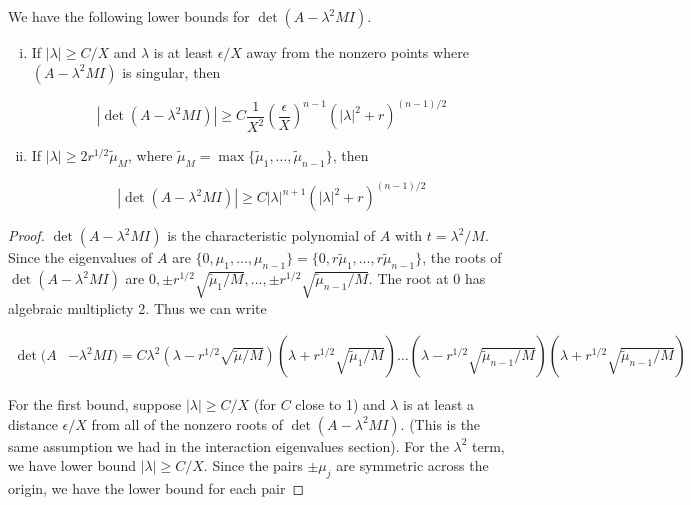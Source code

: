\documentclass[thesis.tex]{subfiles}
\begin{document}
\begin{lemma}\label{detAboundlemma}
We have the following lower bounds for $\det(A - \lambda^2 M I)$.
\begin{enumerate}[(i)]
\item If $|\lambda| \geq C/X$ and $\lambda$ is at least $\epsilon/X$ away from the nonzero points where $(A - \lambda^2 MI)$ is singular, then

\begin{equation}\label{detAbound1}
|\det(A - \lambda^2 M I)|
\geq C \frac{1}{X^2} \left( \frac{\epsilon}{X} \right)^{n-1} \left( |\lambda|^2 + r \right)^{(n-1)/2}
\end{equation}

\item If $|\lambda| \geq 2 r^{1/2} \tilde{\mu}_M$, where $\tilde{\mu}_M = \max\{\tilde{\mu}_1, \dots, \tilde{\mu}_{n-1} \}$, then

\begin{equation}\label{detAbound2}
|\det(A - \lambda^2 M I)|
\geq C |\lambda|^{n+1} \left( |\lambda|^2 + r \right)^{(n-1)/2}
\end{equation}

\end{enumerate}

\begin{proof}
$\det(A - \lambda^2 MI)$ is the characteristic polynomial of $A$ with $t = \lambda^2 / M$. Since the eigenvalues of $A$ are $\{0, \mu_1, \dots, \mu_{n-1}\} = \{0, r \tilde{\mu}_1, \dots, r\tilde{\mu}_{n-1}\}$, the roots of $\det(A - \lambda^2 MI)$ are $0, \pm r^{1/2} \sqrt{\tilde{\mu}_1/M}, \dots, \pm r^{1/2} \sqrt{\tilde{\mu}_{n-1}/M}$. The root at 0 has algebraic multiplicty 2. Thus we can write

\begin{align*}
\det(A &- \lambda^2 M I) 
= C \lambda^2 (\lambda - r^{1/2} \sqrt{\tilde{\mu}/M} )(\lambda + r^{1/2} \sqrt{\tilde{\mu}_1/M} )
\dots(\lambda - r^{1/2} \sqrt{\tilde{\mu}_{n-1}/M})(\lambda + r^{1/2} \sqrt{\tilde{\mu}_{n-1}/M} )
\end{align*}

For the first bound, suppose $|\lambda| \geq C/X$ (for $C$ close to 1) and $\lambda$ is at least a distance $\epsilon/X$ from all of the nonzero roots of $\det(A - \lambda^2 MI)$. (This is the same assumption we had in the interaction eigenvalues section). For the $\lambda^2$ term, we have lower bound $|\lambda| \geq C/X$. Since the pairs $\pm \mu_j$ are symmetric across the origin, we have the lower bound for each pair


\end{proof}
\end{lemma}
\end{document}
